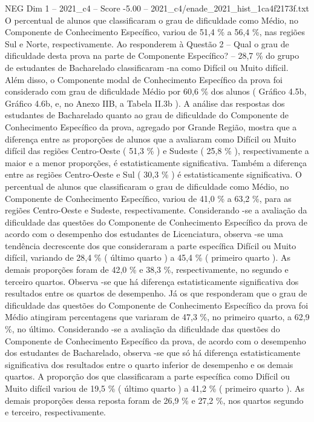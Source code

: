 \begin{textsample}{NEG Dim 1 – 2021\_c4 – Score -5.00 – 2021\_c4/enade\_2021\_hist\_1ca4f2173f.txt}
O percentual de alunos que classificaram o grau de dificuldade como Médio, no Componente de Conhecimento Específico, variou de 51,4 \% a 56,4 \%, nas regiões Sul e Norte, respectivamente.
Ao responderem à Questão 2 – Qual o grau de dificuldade desta prova na parte de Componente Específico? – 28,7 \% do grupo de estudantes de Bacharelado classificaram -na como Difícil ou Muito difícil.
Além disso, o Componente modal de Conhecimento Específico da prova foi considerado com grau de dificuldade Médio por 60,6 \% dos alunos ( Gráfico 4.5b, Gráfico 4.6b, e, no Anexo IIB, a Tabela II.3b ).
A análise das respostas dos estudantes de Bacharelado quanto ao grau de dificuldade do Componente de Conhecimento Específico da prova, agregado por Grande Região, mostra que a diferença entre as proporções de alunos que a avaliaram como Difícil ou Muito difícil das regiões Centro-Oeste ( 51,3 \% ) e Sudeste ( 25,8 \% ), respectivamente a maior e a menor proporções, é estatisticamente significativa.
Também a diferença entre as regiões Centro-Oeste e Sul ( 30,3 \% ) é estatisticamente significativa.
O percentual de alunos que classificaram o grau de dificuldade como Médio, no Componente de Conhecimento Específico, variou de 41,0 \% a 63,2 \%, para as regiões Centro-Oeste e Sudeste, respectivamente.
Considerando -se a avaliação da dificuldade das questões do Componente de Conhecimento Específico da prova de acordo com o desempenho dos estudantes de Licenciatura, observa -se uma tendência decrescente dos que consideraram a parte específica Difícil ou Muito difícil, variando de 28,4 \% ( último quarto ) a 45,4 \% ( primeiro quarto ).
As demais proporções foram de 42,0 \% e 38,3 \%, respectivamente, no segundo e terceiro quartos.
Observa -se que há diferença estatisticamente significativa dos resultados entre os quartos de desempenho.
Já os que responderam que o grau de dificuldade das questões do Componente de Conhecimento Específico da prova foi Médio atingiram percentagens que variaram de 47,3 \%, no primeiro quarto, a 62,9 \%, no último.
Considerando -se a avaliação da dificuldade das questões do Componente de Conhecimento Específico da prova, de acordo com o desempenho dos estudantes de Bacharelado, observa -se que só há diferença estatisticamente significativa dos resultados entre o quarto inferior de desempenho e os demais quartos.
A proporção dos que classificaram a parte específica como Difícil ou Muito difícil variou de 19,5 \% ( último quarto ) a 41,2 \% ( primeiro quarto ).
As demais proporções dessa reposta foram de 26,9 \% e 27,2 \%, nos quartos segundo e terceiro, respectivamente.

\end{textsample}
